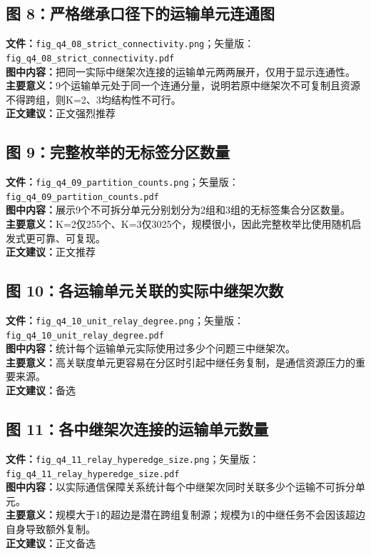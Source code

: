 \subsection*{图 8：严格继承口径下的运输单元连通图}
\textbf{文件：}\texttt{fig\_q4\_08\_strict\_connectivity.png}；矢量版：\texttt{fig\_q4\_08\_strict\_connectivity.pdf}\\
\textbf{图中内容：}把同一实际中继架次连接的运输单元两两展开，仅用于显示连通性。\\
\textbf{主要意义：}9个运输单元处于同一个连通分量，说明若原中继架次不可复制且资源不得跨组，则K=2、3均结构性不可行。\\
\textbf{正文建议：}正文强烈推荐

\subsection*{图 9：完整枚举的无标签分区数量}
\textbf{文件：}\texttt{fig\_q4\_09\_partition\_counts.png}；矢量版：\texttt{fig\_q4\_09\_partition\_counts.pdf}\\
\textbf{图中内容：}展示9个不可拆分单元分别划分为2组和3组的无标签集合分区数量。\\
\textbf{主要意义：}K=2仅255个、K=3仅3025个，规模很小，因此完整枚举比使用随机启发式更可靠、可复现。\\
\textbf{正文建议：}正文推荐

\subsection*{图 10：各运输单元关联的实际中继架次数}
\textbf{文件：}\texttt{fig\_q4\_10\_unit\_relay\_degree.png}；矢量版：\texttt{fig\_q4\_10\_unit\_relay\_degree.pdf}\\
\textbf{图中内容：}统计每个运输单元实际使用过多少个问题三中继架次。\\
\textbf{主要意义：}高关联度单元更容易在分区时引起中继任务复制，是通信资源压力的重要来源。\\
\textbf{正文建议：}备选

\subsection*{图 11：各中继架次连接的运输单元数量}
\textbf{文件：}\texttt{fig\_q4\_11\_relay\_hyperedge\_size.png}；矢量版：\texttt{fig\_q4\_11\_relay\_hyperedge\_size.pdf}\\
\textbf{图中内容：}以实际通信保障关系统计每个中继架次同时关联多少个运输不可拆分单元。\\
\textbf{主要意义：}规模大于1的超边是潜在跨组复制源；规模为1的中继任务不会因该超边自身导致额外复制。\\
\textbf{正文建议：}正文备选

